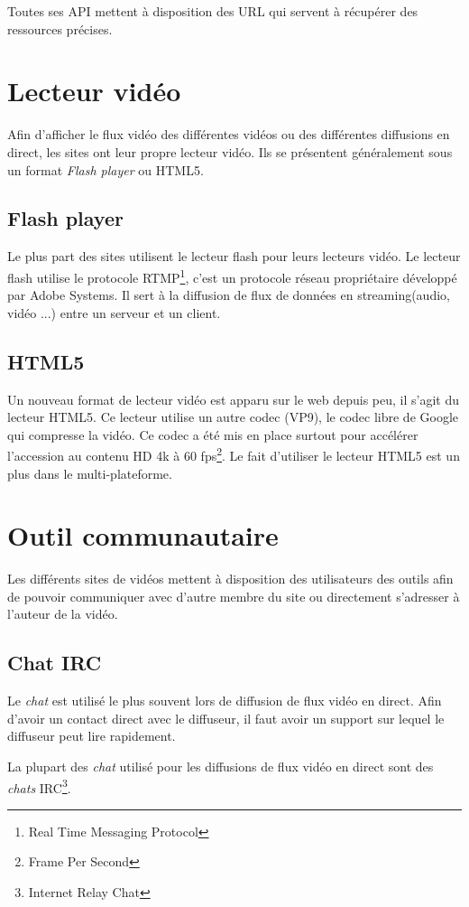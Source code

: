 \documentclass[11pt]{report} %
\begin{document}
		Toutes ses API mettent à disposition des URL qui servent à récupérer des ressources précises. 
		
		
	\section{Lecteur vidéo}
	Afin d'afficher le flux vidéo des différentes vidéos ou des différentes diffusions en direct, les sites ont leur propre lecteur vidéo.
	Ils se présentent généralement sous un format \textit{Flash player} ou HTML5.
	
		\subsection{Flash player}
		Le plus part des sites utilisent le lecteur flash pour leurs lecteurs vidéo. Le lecteur flash utilise le protocole RTMP\footnote{Real Time Messaging Protocol}, c'est un protocole réseau propriétaire développé par Adobe Systems. Il sert à la diffusion de flux de données en streaming(audio, vidéo ...) entre un serveur et un client.
		
		\subsection{HTML5}
		Un nouveau format de lecteur vidéo est apparu sur le web depuis peu, il s'agit du lecteur HTML5. Ce lecteur utilise un autre codec (VP9), le codec libre de Google qui compresse la vidéo. Ce codec a été mis en place surtout pour accélérer l'accession au contenu HD 4k à 60 fps\footnote{Frame Per Second}.
		Le fait d'utiliser le lecteur HTML5 est un plus dans le multi-plateforme.
	
	\section{Outil communautaire}
	Les différents sites de vidéos mettent à disposition des utilisateurs des outils afin de pouvoir communiquer avec d'autre membre du site ou directement s'adresser à l'auteur de la vidéo.
		\subsection{Chat IRC}
		\label{chat}
		Le \textit{chat} est utilisé le plus souvent lors de diffusion de flux vidéo en direct. Afin d'avoir un contact direct avec le diffuseur, il faut avoir un support sur lequel le diffuseur peut lire rapidement.
		
		La plupart des \textit{chat} utilisé pour les diffusions de flux vidéo en direct sont des \textit{chats} IRC\footnote{Internet Relay Chat}.
		
\end{document}
